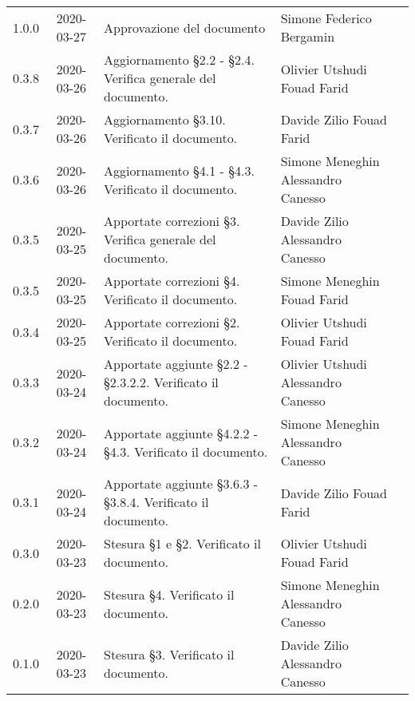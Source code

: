 {\begin{longtable}{ c c  C{4cm}  C{3.8cm}  C{3cm} }
    1.0.0 & 2020-03-27 & Approvazione del documento & Simone Federico Bergamin &\Res{} \\
    	0.3.8 & 2020-03-26 & Aggiornamento \S 2.2 - \S 2.4. Verifica generale del documento. & Olivier Utshudi \newline Fouad Farid &\adm{} \newline  \ver{}\\
		0.3.7 & 2020-03-26 & Aggiornamento \S 3.10. Verificato il documento.& Davide Zilio \newline Fouad Farid &\adm{} \newline  \ver{}\\
		0.3.6 & 2020-03-26 & Aggiornamento \S 4.1 - \S 4.3. Verificato il documento.  & Simone Meneghin \newline Alessandro Canesso &\adm{} \newline  \ver{}\\
		0.3.5 & 2020-03-25 & Apportate correzioni \S 3. Verifica generale del documento.  & Davide Zilio \newline Alessandro Canesso &\adm{} \newline  \ver{}\\
    	0.3.5 & 2020-03-25 & Apportate correzioni \S 4. Verificato il documento. & Simone Meneghin \newline Fouad Farid &\adm{} \newline  \ver{}\\	
   		0.3.4 & 2020-03-25 & Apportate correzioni \S 2. Verificato il documento.& Olivier Utshudi \newline Fouad Farid &\adm{} \newline  \ver{}\\
		0.3.3 & 2020-03-24 & Apportate aggiunte \S 2.2 - \S 2.3.2.2. Verificato il documento. & Olivier Utshudi \newline Alessandro Canesso &\adm{} \newline  \ver{}\\
		0.3.2 & 2020-03-24 & Apportate aggiunte \S 4.2.2 - \S 4.3. Verificato il documento. & Simone Meneghin \newline Alessandro Canesso &\adm{} \newline  \ver{}\\		
		0.3.1 & 2020-03-24 & Apportate aggiunte \S 3.6.3 - \S 3.8.4. Verificato il documento. & Davide Zilio \newline Fouad Farid &\adm{} \newline  \ver{}\\
		0.3.0 & 2020-03-23 & Stesura \S 1 e \S 2. Verificato il documento. & Olivier Utshudi \newline Fouad Farid &\adm{} \newline  \ver{}\\
		0.2.0 & 2020-03-23 & Stesura \S 4. Verificato il documento. & Simone Meneghin \newline Alessandro Canesso &\adm{} \newline  \ver{}\\
		0.1.0 & 2020-03-23 & Stesura \S 3. Verificato il documento. & Davide Zilio \newline Alessandro Canesso &\adm{} \newline  \ver{}\\		
	\end{longtable}
}